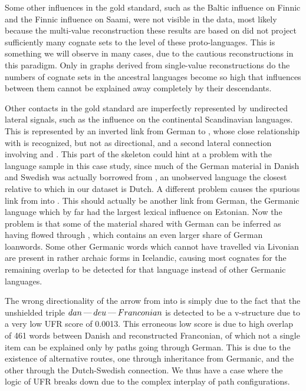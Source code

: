  Some other influences in the gold standard, such as the Baltic influence on Finnic and the Finnic influence on Saami, were not visible in the data, most likely because the multi-value reconstruction these results are based on did not project sufficiently many cognate sets to the level of these proto-languages. This is something we will observe in many cases, due to the cautious reconstructions in this paradigm. Only in graphs derived from single-value reconstructions do the numbers of cognate sets in the ancestral languages become so high that influences between them cannot be explained away completely by their descendants.
 
 Other contacts in the gold standard are imperfectly represented by undirected lateral signals, such as the  influence on the continental Scandinavian languages. This is represented by an inverted link from German to , whose close relationship with  is recognized, but not as directional, and a second lateral connection involving  and . This part of the skeleton could hint at a problem with the language sample in this case study, since much of the German material in Danish and Swedish was actually borrowed from , an unobserved language the closest relative to which in our dataset is Dutch. A different problem causes the spurious link from  into . This should actually be another link from German, the Germanic language which by far had the largest lexical influence on Estonian. Now the problem is that some of the material shared with German can be inferred as having flowed through , which contains an even larger share of German loanwords. Some other Germanic words which cannot have travelled via Livonian are present in rather archaic forms in Icelandic, causing most cognates for the remaining overlap to be detected for that language instead of other Germanic languages.
 
 The wrong directionality of the arrow from  into  is simply due to the fact that the unshielded triple $dan \kern 2pt\hbox{---}\kern 2pt deu \kern 2pt\hbox{---}\kern 2pt Franconian$ is detected to be a v-structure due to a very low UFR score of 0.0013. This erroneous low score is due to high overlap of 461 words between Danish and reconstructed Franconian, of which not a single item can be explained only by paths going through German. This is due to the existence of alternative routes, one through inheritance from Germanic, and the other through the Dutch-Swedish connection. We thus have a case where the logic of UFR breaks down due to the complex interplay of path configurations.
 
